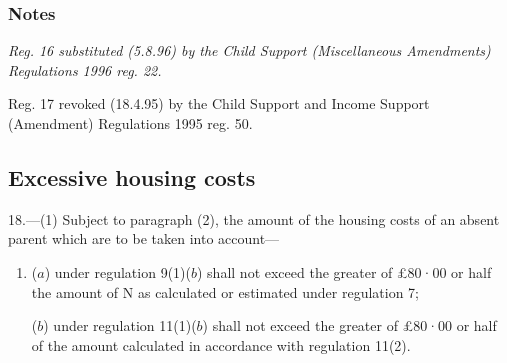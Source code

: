 \documentclass[a4paper]{article}
\newcommand\amendment[1]{\subsubsection*{Notes}{\itshape\frenchspacing\footnotesize #1 \par\goodbreak}}
\begin{document}
\amendment{
Reg. 16 substituted (5.8.96) by the Child Support (Miscellaneous Amendments) Regulations 1996 reg. 22.

\medskip

Reg. 17 revoked (18.4.95) by the Child Support and Income Support (Amendment) Regulations 1995 reg. 50.
}

%
%
%
%
%


\subsection[18. Excessive housing costs]{Excessive housing costs}

18.—(1) Subject to paragraph (2), the amount of the housing costs of an absent parent which are to be taken into account—
\begin{enumerate}\item[]
($a$) under regulation 9(1)($b$) shall not exceed the greater of £80·00 or half the amount of N as calculated or estimated under regulation 7;

($b$) under regulation 11(1)($b$) shall not exceed the greater of £80·00 or half of the amount calculated in accordance with regulation 11(2).
\end{enumerate}
\end{document}
